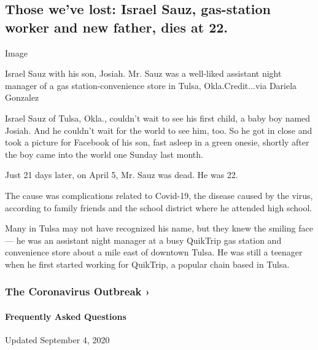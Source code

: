 \hypertarget{those-weve-lost-israel-sauz-gas-station-worker-and-new-father-dies-at-22}{%
\subsection{Those we've lost: Israel Sauz, gas-station worker and new
father, dies at
22.}\label{those-weve-lost-israel-sauz-gas-station-worker-and-new-father-dies-at-22}}

Image

Israel Sauz with his son, Josiah. Mr. Sauz was a well-liked assistant
night manager of a gas station-convenience store in Tulsa,
Okla.Credit...via Dariela Gonzalez

Israel Sauz of Tulsa, Okla., couldn't wait to see his first child, a
baby boy named Josiah. And he couldn't wait for the world to see him,
too. So he got in close and took a picture for Facebook of his son, fast
asleep in a green onesie, shortly after the boy came into the world one
Sunday last month.

Just 21 days later, on April 5, Mr. Sauz was dead. He was 22.

The cause was complications related to Covid-19, the disease caused by
the virus, according to family friends and the school district where he
attended high school.

Many in Tulsa may not have recognized his name, but they knew the
smiling face --- he was an assistant night manager at a busy QuikTrip
gas station and convenience store about a mile east of downtown Tulsa.
He was still a teenager when he first started working for QuikTrip, a
popular chain based in Tulsa.

\href{https://www.nytimes3xbfgragh.onion/news-event/coronavirus?action=click\&pgtype=Article\&state=default\&region=MAIN_CONTENT_3\&context=storylines_faq}{}

\hypertarget{the-coronavirus-outbreak-}{%
\subsubsection{The Coronavirus Outbreak
›}\label{the-coronavirus-outbreak-}}

\hypertarget{frequently-asked-questions}{%
\paragraph{Frequently Asked
Questions}\label{frequently-asked-questions}}

Updated September 4, 2020

